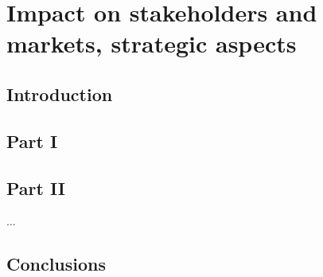 \chapter{Impact on stakeholders and markets, strategic aspects}

\section{Introduction}

\section{Part I}\label{Part I}  %


\section{Part II}\label{Part II} %

...

\section{Conclusions}\label{conclusions}
